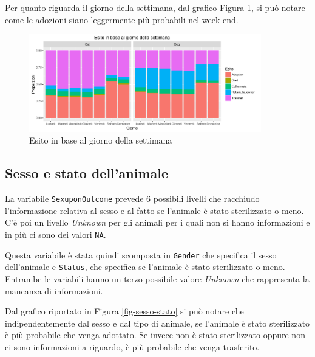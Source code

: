 Per quanto riguarda il giorno della settimana, dal grafico Figura \ref{fig-dow}, si può notare come le adozioni siano leggermente più probabili nel week-end.

\begin{figure}[htbp]
	\centering
	\includegraphics[width=0.9\textwidth]{./grafici/esito_week.pdf}
	\caption{Esito in base al giorno della settimana}\label{fig-dow}
\end{figure}

\subsection{Sesso e stato dell'animale}

La variabile \texttt{SexuponOutcome} prevede 6 possibili livelli che racchiudo l'informazione relativa al sesso e al fatto se l'animale è stato sterilizzato o meno. C'è poi un livello \textit{Unknown} per gli animali per i quali non si hanno informazioni e in più ci sono dei valori \texttt{NA}.

Questa variabile è stata quindi scomposta in \texttt{Gender} che specifica il sesso dell'animale e \texttt{Status}, che specifica se l'animale è stato sterilizzato o meno. Entrambe le variabili hanno un terzo possibile valore \textit{Unknown} che rappresenta la mancanza di informazioni.

Dal grafico riportato in Figura \ref{fig-sesso-stato} si può notare che indipendentemente dal sesso e dal tipo di animale, se l'animale è stato sterilizzato è più probabile che venga adottato. Se invece non è stato sterilizzato oppure non ci sono informazioni a riguardo, è più probabile che venga trasferito.

